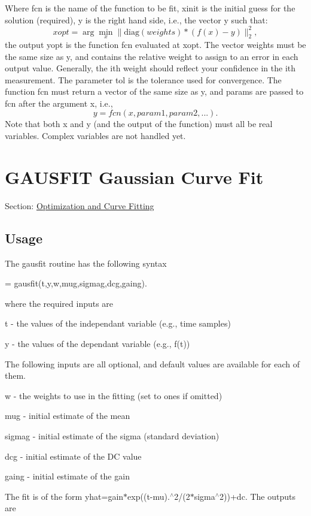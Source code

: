  Where {\ttfamily fcn} is the name of the function to be fit, {\ttfamily xinit} is the initial guess for the solution (required), {\ttfamily y} is the right hand side, i.\-e., the vector {\ttfamily y} such that\-: \[ xopt = \arg \min_{x} \|\mathrm{diag}(weights)*(f(x) - y)\|_2^2, \] the output {\ttfamily yopt} is the function {\ttfamily fcn} evaluated at {\ttfamily xopt}. The vector {\ttfamily weights} must be the same size as {\ttfamily y}, and contains the relative weight to assign to an error in each output value. Generally, the ith weight should reflect your confidence in the ith measurement. The parameter {\ttfamily tol} is the tolerance used for convergence. The function {\ttfamily fcn} must return a vector of the same size as {\ttfamily y}, and {\ttfamily params} are passed to {\ttfamily fcn} after the argument {\ttfamily x}, i.\-e., \[ y = fcn(x,param1,param2,...). \] Note that both {\ttfamily x} and {\ttfamily y} (and the output of the function) must all be real variables. Complex variables are not handled yet. \hypertarget{curvefit_gausfit}{}\section{G\-A\-U\-S\-F\-I\-T Gaussian Curve Fit}\label{curvefit_gausfit}
Section\-: \hyperlink{sec_curvefit}{Optimization and Curve Fitting} \hypertarget{vtkwidgets_vtkxyplotwidget_Usage}{}\subsection{Usage}\label{vtkwidgets_vtkxyplotwidget_Usage}
The {\ttfamily gausfit} routine has the following syntax \begin{DoxyVerb}   = gausfit(t,y,w,mug,sigmag,dcg,gaing).
\end{DoxyVerb}
 where the required inputs are 
\begin{DoxyItemize}
\item {\ttfamily t} -\/ the values of the independant variable (e.\-g., time samples)  
\item {\ttfamily y} -\/ the values of the dependant variable (e.\-g., f(t))  
\end{DoxyItemize}The following inputs are all optional, and default values are available for each of them. 
\begin{DoxyItemize}
\item {\ttfamily w} -\/ the weights to use in the fitting (set to ones if omitted)  
\item {\ttfamily mug} -\/ initial estimate of the mean  
\item {\ttfamily sigmag} -\/ initial estimate of the sigma (standard deviation)  
\item {\ttfamily dcg} -\/ initial estimate of the D\-C value  
\item {\ttfamily gaing} -\/ initial estimate of the gain  
\end{DoxyItemize}The fit is of the form {\ttfamily yhat=gain$\ast$exp((t-\/mu).$^\wedge$2/(2$\ast$sigma$^\wedge$2))+dc}. The outputs are 
